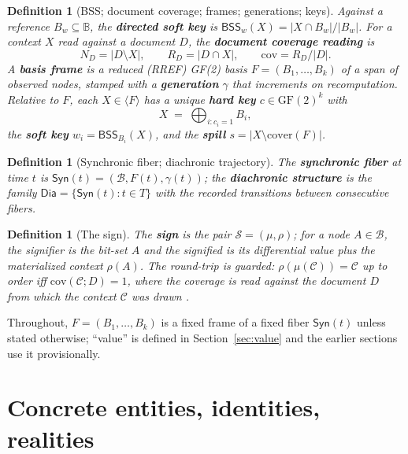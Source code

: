 \documentclass[11pt,a4paper]{article}
\newtheorem{definition}[principle]{Definition}
\theoremstyle{remark}
\newcommand{\Plane}{\ensuremath{\mathbb{B}}}            %
\newcommand{\Lat}{\ensuremath{\mathcal{B}}}              %
\newcommand{\BSS}{\ensuremath{\mathsf{BSS}}}             %
\newcommand{\spanof}[1]{\ensuremath{\langle #1\rangle}}  %
\newcommand{\Ctx}{\ensuremath{\mathcal{C}}}              %
\newcommand{\Ing}{\ensuremath{\mu}}                      %
\newcommand{\Mat}{\ensuremath{\rho}}                     %
\newcommand{\Sign}{\ensuremath{\mathcal{S}}}             %
\newcommand{\Cov}{\ensuremath{\mathrm{cov}}}             %
\newcommand{\Sync}{\ensuremath{\mathsf{Syn}}}            %
\newcommand{\Dia}{\ensuremath{\mathsf{Dia}}}             %
\newcommand{\Gen}{\ensuremath{\gamma}}                   %
\newcommand{\cover}{\ensuremath{\mathrm{cover}}}         %
\begin{document}
\begin{definition}[BSS; document coverage; frames; generations; keys]
\label{def:frame}
Against a reference $B_w \subseteq \Plane$, the \textbf{directed soft key} is
$\BSS_w(X) = |X \cap B_w| / |B_w|$. For a context $X$ read against a document
$D$, the \textbf{document coverage reading} is
\[
  N_D = |D \setminus X|, \qquad R_D = |D \cap X|, \qquad \Cov = R_D/|D|.
\]
A \textbf{basis frame} is a reduced (RREF) GF(2) basis $F=(B_1,\dots,B_k)$ of
a span of observed nodes, stamped with a \textbf{generation} $\Gen$ that
increments on recomputation. Relative to $F$, each $X \in \spanof{F}$ has a
unique \textbf{hard key} $c \in \mathrm{GF}(2)^k$ with
\[
  X \;=\; \bigoplus_{i : c_i = 1} B_i,
\]
the \textbf{soft key} $w_i = \BSS_{B_i}(X)$, and the \textbf{spill}
$s = |X \setminus \cover(F)|$.
\end{definition}

\begin{definition}[Synchronic fiber; diachronic trajectory]
\label{def:syn-dia}
The \textbf{synchronic fiber} at time $t$ is $\Sync(t) = (\Lat, F(t),
\Gen(t))$; the \textbf{diachronic structure} is the family $\Dia = \{\Sync(t)
: t \in T\}$ with the recorded transitions between consecutive fibers.
\end{definition}

\begin{definition}[The sign]
\label{def:sign}
The \textbf{sign} is the pair $\Sign = (\Ing,\Mat)$; for a node $A \in \Lat$,
the signifier is the bit-set $A$ and the signified is its differential value
plus the materialized context $\Mat(A)$. The round-trip is guarded:
$\Mat(\Ing(\Ctx)) = \Ctx$ up to order iff $\Cov(\Ctx; D)=1$, where the
coverage is read against the document $D$ from which the context $\Ctx$ was
drawn \cite{langue2026}.
\end{definition}

Throughout, $F=(B_1,\dots,B_k)$ is a fixed frame of a fixed fiber
$\Sync(t)$ unless stated otherwise; ``value'' is defined in
Section~\ref{sec:value} and the earlier sections use it provisionally.

\section{Concrete entities, identities, realities}
\label{sec:entities}
\end{document}
